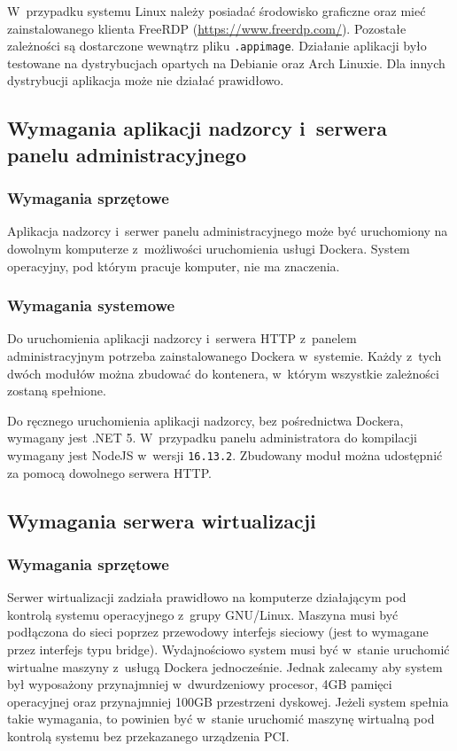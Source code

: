 \documentclass[../opis-rozwiazania.tex]{subfiles}
\begin{document}
W~przypadku systemu Linux należy posiadać środowisko graficzne oraz mieć zainstalowanego klienta FreeRDP (\url{https://www.freerdp.com/}).
Pozostałe zależności są dostarczone wewnątrz pliku \texttt{.appimage}.
Działanie aplikacji było testowane na dystrybucjach opartych na Debianie oraz Arch Linuxie.
Dla innych dystrybucji aplikacja może nie działać prawidłowo.

\subsection{Wymagania aplikacji nadzorcy i~serwera panelu administracyjnego}

\subsubsection{Wymagania sprzętowe}
Aplikacja nadzorcy i~serwer panelu administracyjnego może być uruchomiony na dowolnym komputerze z~możliwości uruchomienia usługi Dockera.
System operacyjny, pod którym pracuje komputer, nie ma znaczenia.

\subsubsection{Wymagania systemowe}
Do uruchomienia aplikacji nadzorcy i~serwera HTTP z~panelem administracyjnym potrzeba zainstalowanego Dockera w~systemie.
Każdy z~tych dwóch modułów można zbudować do kontenera, w~którym wszystkie zależności zostaną spełnione.

Do ręcznego uruchomienia aplikacji nadzorcy, bez pośrednictwa Dockera, wymagany jest .NET 5. W~przypadku panelu administratora do kompilacji wymagany jest NodeJS w~wersji \texttt{16.13.2}. Zbudowany moduł można udostępnić za pomocą dowolnego serwera HTTP.

\subsection{Wymagania serwera wirtualizacji}
\label{system_requirements.virtsrv_rquirements}

\subsubsection{Wymagania sprzętowe}
Serwer wirtualizacji zadziała prawidłowo na komputerze działającym pod kontrolą systemu operacyjnego z~grupy GNU/Linux.
Maszyna musi być podłączona do sieci poprzez przewodowy interfejs sieciowy (jest to wymagane przez interfejs typu bridge).
Wydajnościowo system musi być w~stanie uruchomić wirtualne maszyny z~usługą Dockera jednocześnie.
Jednak zalecamy aby system był wyposażony przynajmniej w~dwurdzeniowy procesor, 4GB pamięci operacyjnej oraz przynajmniej 100GB przestrzeni dyskowej.
Jeżeli system spełnia takie wymagania, to powinien być w~stanie uruchomić maszynę wirtualną pod kontrolą systemu bez przekazanego urządzenia PCI.
\end{document}
